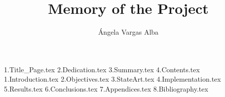 \documentclass[a4paper, 12pt]{book}
\title{Memory of the Project}
\author{Ángela Vargas Alba}
\begin{document}
\renewcommand{\appendixname}{Appendix}

{1.Title_Page.tex}
{2.Dedication.tex}
{3.Summary.tex}
{4.Contents.tex}
{1.Introduction.tex}
{2.Objectives.tex}
{3.StateArt.tex}
{4.Implementation.tex}
{5.Results.tex}
{6.Conclusions.tex}
{7.Appendices.tex}
{8.Bibliography.tex}
\end{document}
